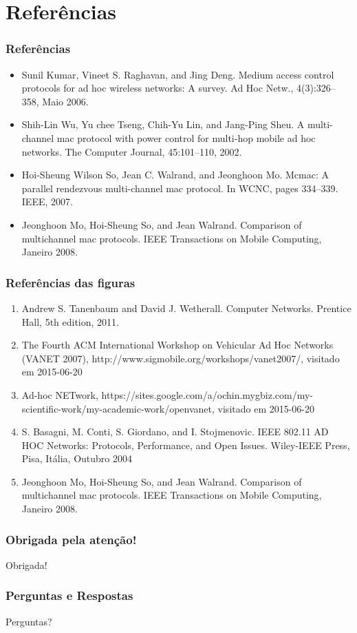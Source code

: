 \section{Referências}

\begin{frame}
  \frametitle{Referências}
  \begin{itemize}
    \item \footnotesize Sunil Kumar, Vineet S. Raghavan, and Jing Deng. Medium access control protocols for ad hoc wireless networks: A survey. Ad Hoc Netw., 4(3):326–358, Maio 2006.
    \item \footnotesize Shih-Lin Wu, Yu chee Tseng, Chih-Yu Lin, and Jang-Ping Sheu. A multi-channel mac protocol with power control for multi-hop mobile ad hoc networks. The Computer Journal, 45:101–110, 2002.
    \item \footnotesize Hoi-Sheung Wilson So, Jean C. Walrand, and Jeonghoon Mo. Mcmac: A parallel rendezvous multi-channel mac protocol. In WCNC, pages 334–339. IEEE, 2007.
    \item \footnotesize Jeonghoon Mo, Hoi-Sheung So, and Jean Walrand. Comparison of multichannel mac protocols. IEEE Transactions on Mobile Computing, Janeiro 2008.
  \end{itemize}
\end{frame}

\begin{frame}
  \frametitle{Referências das figuras}
  \begin{enumerate}
    \item \footnotesize Andrew S. Tanenbaum and David J. Wetherall. Computer Networks. Prentice Hall, 5th edition, 2011.
    \item \footnotesize The Fourth ACM International Workshop on Vehicular Ad Hoc Networks (VANET 2007), http://www.sigmobile.org/workshops/vanet2007/, visitado em 2015-06-20
    \item \footnotesize Ad-hoc NETwork, https://sites.google.com/a/ochin.mygbiz.com/my-scientific-work/my-academic-work/openvanet, visitado em 2015-06-20
    \item \footnotesize S. Basagni, M. Conti, S. Giordano, and I. Stojmenovic. IEEE 802.11 AD HOC Networks: Protocols, Performance, and Open Issues. Wiley-IEEE Press, Pisa, Itália, Outubro 2004
    \item \footnotesize Jeonghoon Mo, Hoi-Sheung So, and Jean Walrand. Comparison of multichannel mac protocols. IEEE Transactions on Mobile Computing, Janeiro 2008.
  \end{enumerate}
\end{frame}

\appendix

\begin{frame}
  \frametitle{Obrigada pela atenção!}
  \begin{center}
    {\Huge Obrigada!}
  \end{center}
\end{frame}

\begin{frame}
  \frametitle{Perguntas e Respostas}
  \begin{center}
    {\Huge Perguntas?}
  \end{center}
\end{frame}